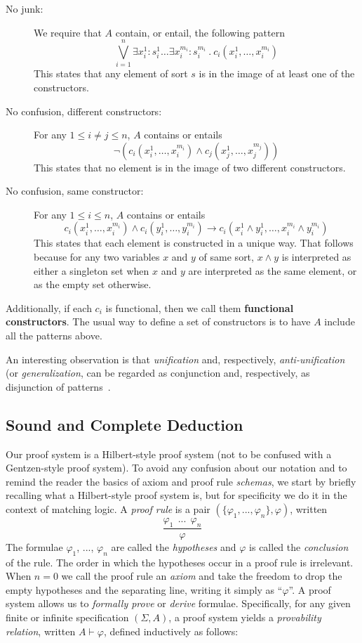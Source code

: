 \documentclass[UTF8,11pt]{article}
\theoremstyle{plain}
\theoremstyle{definition}
\theoremstyle{remark}
\newcommand{\ra}{\rightarrow}
\begin{document}
\begin{description}
\item[No junk:]
We require that $A$ contain, or entail, the following pattern
$$
\bigvee_{i=1}^n \exists x_i^1:s_i^1\dots\exists x_i^{m_i}:s_i^{m_i}\ .\ 
c_i(x_i^1,\dots,x_i^{m_i})
$$
This states that any element of sort $s$ is in the image of at least one of
the constructors.
 
\item[No confusion, different constructors:]
For any $1 \leq i \neq j \leq n$, $A$ contains or entails
$$
\neg(c_i(x_i^1,\dots,x_i^{m_i}) \wedge c_j(x_j^1,\dots,x_j^{m_j}))
$$
This states that no element is in the image of two different constructors.
\item[No confusion, same constructor:] For any $1\leq i\leq n$, $A$ contains
or entails
$$
c_i(x_i^1,\dots,x_i^{m_i}) \wedge
c_i(y_i^1,\dots,y_i^{m_i}) \ra
c_i(x_i^1 \wedge y_i^1,\dots,x_i^{m_i}\wedge y_i^{m_i})
$$
This states that each element is constructed in a unique way.
That follows because for any two variables $x$ and $y$ of same sort,
$x \wedge y$ is interpreted as either a singleton set when $x$ and $y$
are interpreted as the same element, or as the empty set otherwise.
\end{description}
Additionally, if each $c_i$ is functional, then we call them
\textbf{functional constructors}.
The usual way to define a set of constructors is to have $A$
include all the patterns above.

An interesting observation is that \emph{unification} and, respectively,
\emph{anti-unification} (or \emph{generalization},
can be regarded as conjunction and, respectively, as disjunction of
patterns~\cite{rosu-2017-lmcs}.

\subsection{Sound and Complete Deduction}
\label{sec:deduction}

\newcommand{\sequent}[2]{{#1}\vdash{#2}}

Our proof system is a Hilbert-style proof system (not to be confused with a
Gentzen-style proof system).
To avoid any confusion about our notation and to remind the reader the
basics of axiom and proof rule \emph{schemas}, we start by briefly recalling
what a Hilbert-style proof system is, but for specificity we do it in the
context of matching logic.
A \emph{proof rule} is a pair $(\{\varphi_1,...,\varphi_n\},\varphi)$,
written
$$
\frac{
\varphi_1 \ \ ... \ \ \varphi_n
}{\varphi}
$$
The formulae $\varphi_1$, ..., $\varphi_n$ are called the \emph{hypotheses}
and $\varphi$ is called the \emph{conclusion} of the rule.
The order in which the hypotheses occur in a proof rule is irrelevant.
When $n = 0$ we call the proof rule an \emph{axiom} and take the freedom to
drop the empty hypotheses and the separating line, writing it simply as
``$\varphi$''.
A proof system allows us to \emph{formally prove} or \emph{derive} formulae.
Specifically, for any given finite or infinite specification $(\Sigma,A)$,
a proof system yields a \emph{provability relation},
written $\sequent{A}{\varphi}$, defined inductively as follows:
\end{document}

